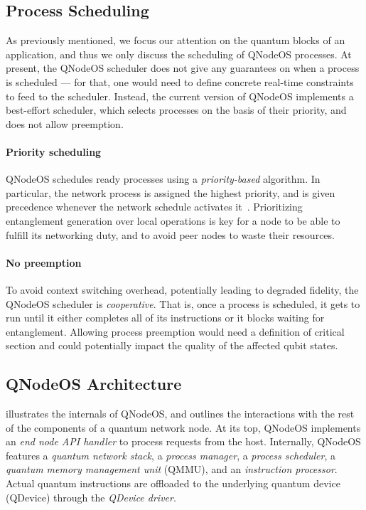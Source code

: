 \subsection{Process Scheduling}

As previously mentioned, we focus our attention on the quantum blocks of an application, and thus we
only discuss the scheduling of QNodeOS processes. At present, the QNodeOS scheduler does not give
any guarantees on when a process is scheduled --- for that, one would need to define concrete
real-time constraints to feed to the scheduler. Instead, the current version of QNodeOS implements a
best-effort scheduler, which selects processes on the basis of their priority, and does not allow
preemption.

\paragraph{Priority scheduling}

QNodeOS schedules ready processes using a \emph{priority-based} algorithm. In particular, the
network process is assigned the highest priority, and is given precedence whenever the network
schedule activates it~\cite{skrzypczyk_2021_arch}. Prioritizing entanglement generation over local
operations is key for a node to be able to fulfill its networking duty, and to avoid peer nodes to
waste their resources.

\paragraph{No preemption}

To avoid context switching overhead, potentially leading to degraded fidelity, the QNodeOS scheduler
is \emph{cooperative}. That is, once a process is scheduled, it gets to run until it either
completes all of its instructions or it blocks waiting for entanglement. Allowing process preemption
would need a definition of critical section and could potentially impact the quality of the affected
qubit states.

\subsection{QNodeOS Architecture}

 illustrates the internals of QNodeOS, and outlines the interactions with the
rest of the components of a quantum network node. At its top, QNodeOS implements an \emph{end node
    API handler} to process requests from the host. Internally, QNodeOS features a \emph{quantum network
    stack}, a \emph{process manager}, a \emph{process scheduler}, a \emph{quantum memory management
    unit} (QMMU), and an \emph{instruction processor}. Actual quantum instructions are offloaded to the
underlying quantum device (QDevice) through the \emph{QDevice driver}.

